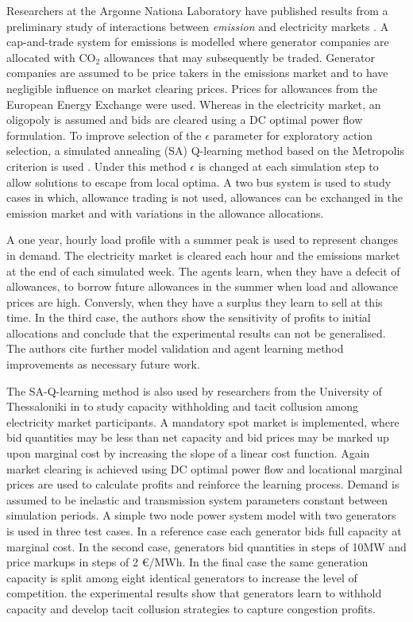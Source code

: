 Researchers at the Argonne Nationa Laboratory have published results from a
preliminary study of interactions between \textit{emission} and electricity
markets \cite{wang:09}.  A cap-and-trade system for emissions is modelled where
generator companies are allocated with $\mbox{CO}_2$ allowances that may
subsequently be traded.  Generator companies are assumed to be price takers in
the emissions market and to have negligible influence on market clearing
prices. Prices for allowances from the European Energy Exchange were used.
Whereas in the electricity market, an oligopoly is assumed and bids are cleared
using a DC optimal power flow formulation.  To improve selection of the
$\epsilon$ parameter for exploratory action selection, a simulated annealing
(SA) Q-learning method based on the Metropolis criterion is used \cite{guo:sa}.
Under this method $\epsilon$ is changed at each simulation step to allow
solutions to escape from local optima.  A two bus system is used to study cases
in which, allowance trading is not used, allowances can be exchanged in the
emission market and with variations in the allowance allocations.

A one year, hourly load profile with a summer peak is used to represent changes
in demand.  The electricity market is cleared each hour and the emissions market
at the end of each simulated week.  The agents learn, when they have a defecit
of allowances, to borrow future allowances in the summer when load and
allowance prices are high.  Conversly, when they have a surplus they learn to
sell at this time.  In the third case, the authors show the sensitivity of
profits to initial allocations and conclude that the experimental results can
not be generalised.  The authors cite further model validation and agent
learning method improvements as necessary future work.

The SA-Q-learning method is also used by researchers from the University of
Thessaloniki in \cite{tellidou:tacit} to study capacity withholding and tacit
collusion among electricity market participants.  A mandatory spot market is
implemented, where bid quantities may be less than net capacity and bid prices
may be marked up upon marginal cost by increasing the slope of a linear cost
function.  Again market clearing is achieved using DC optimal power flow and
locational marginal prices are used to calculate profits and reinforce the
learning process.  Demand is assumed to be inelastic and transmission
system parameters constant between simulation periods.  A simple two node
power system model with two generators is used in three test cases.  In a
reference case each generator bids full capacity at marginal cost.  In the
second case, generators bid quantities in steps of 10MW and price markups in
steps of 2 \euro/MWh.  In the final case the same generation capacity is split
among eight identical generators to increase the level of competition.  the
experimental results show that generators learn to withhold capacity and develop
tacit collusion strategies to capture congestion profits.

